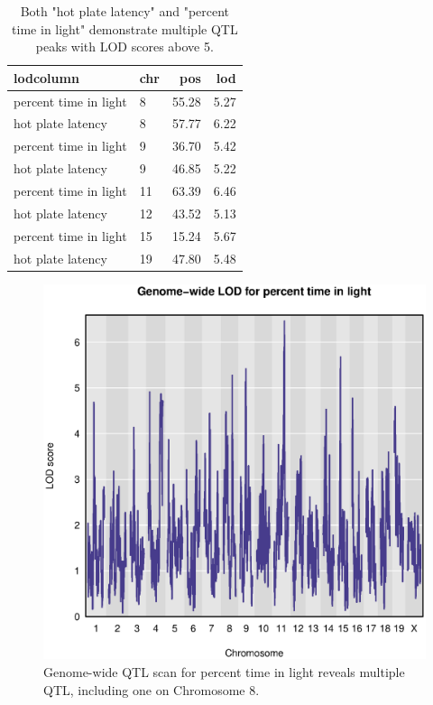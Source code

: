 \documentclass[12pt,twoside, lineno]{gsajnl}
\begin{document}
\begin{table}[hb]
\caption{Both "hot plate latency" and "percent time in light"
  demonstrate multiple QTL peaks with LOD scores above 5.}
  \label{table-peaks}
\begin{center}
\begin{tabular}{l|lrr}
  \hline
lodcolumn & chr & pos & lod \\
   \hline
percent time in light & 8 & 55.28 & 5.27 \\
 hot plate latency & 8 & 57.77 & 6.22 \\
 percent time in light & 9 & 36.70 & 5.42 \\
 hot plate latency & 9 & 46.85 & 5.22 \\
 percent time in light & 11 & 63.39 & 6.46 \\
 hot plate latency & 12 & 43.52 & 5.13 \\
 percent time in light & 15 & 15.24 & 5.67 \\
 hot plate latency & 19 & 47.80 & 5.48 \\
   \hline
\end{tabular}
\end{center}
\end{table}







\clearpage


\renewcommand{\thefigure}{\textbf{S\arabic{figure}}}
\setcounter{figure}{0}

\begin{figure}[hb]
\includegraphics{../Rmd/genomewide_lod_trait10.eps}
\caption{Genome-wide QTL scan for percent time in light reveals
  multiple QTL, including one on Chromosome 8.}
\label{fig:genomewide10}
\end{figure}
\end{document}
